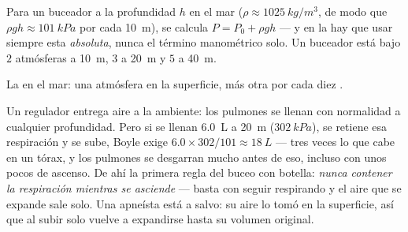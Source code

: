 \begin{method}\label{met:g10:pressure:dive}
Para un buceador a la profundidad $h$ en el mar
($\rho \approx \qty{1025}{kg/m^3}$, de modo que
$\rho g h \approx \qty{101}{kPa}$ por cada \qty{10}{m}), se calcula
$P = P_0 + \rho g h$ --- y en la  hay que usar siempre esta
 \emph{absoluta}, nunca el término
manométrico solo. Un buceador está bajo $2$ atmósferas a \qty{10}{m},
$3$ a \qty{20}{m} y $5$ a \qty{40}{m}.
\end{method}

\begin{omfigure}

{\small La  en el mar: una atmósfera en la superficie,
más otra por cada diez .}
\end{omfigure}

\begin{remark}\label{rem:g10:pressure:breath}
Un regulador entrega aire a la  ambiente: los pulmones se llenan
con normalidad a cualquier profundidad. Pero si se llenan \qty{6.0}{L} a
\qty{20}{m} ($\qty{302}{kPa}$), se retiene esa respiración y se sube,
Boyle exige $6.0 \times 302/101 \approx \qty{18}{L}$ --- tres veces lo
que cabe en un tórax, y los pulmones se desgarran mucho antes de eso,
incluso con unos pocos  de ascenso. De ahí la primera regla del
buceo con botella: \emph{nunca contener la respiración mientras se
asciende} --- basta con seguir respirando y el aire que se expande sale
solo. Una apneísta está a salvo: su aire lo tomó en la superficie, así
que al subir solo vuelve a expandirse hasta su volumen original.
\end{remark}

